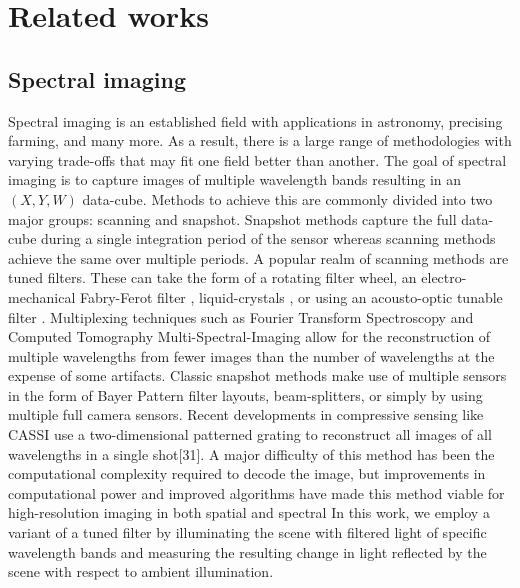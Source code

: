 \section{Related works}
\subsection{Spectral imaging}

Spectral imaging is an established field with applications in astronomy, precising farming, and many more.
As a result, there is a large range of methodologies with varying trade-offs that may fit one field better than another.
The goal of spectral imaging is to capture images of multiple wavelength bands resulting in an $(X,Y,W)$ data-cube.
Methods to achieve this are commonly divided into two major groups: scanning and snapshot.
Snapshot methods capture the full data-cube during a single integration period of the sensor whereas scanning methods achieve the same over multiple periods.
\newline
\newline
A popular realm of scanning methods are tuned filters. These can take the form of a rotating filter wheel, an electro-mechanical Fabry-Ferot filter\cite{MEMSFabryFerot} \cite{Atherton1981}, liquid-crystals \cite{Gupta2008}, or using an acousto-optic tunable filter \cite{poger2001multispectral}.
\newline
Multiplexing techniques such as Fourier Transform Spectroscopy\cite{} and Computed
Tomography Multi-Spectral-Imaging\cite{} allow for the reconstruction of multiple
wavelengths from fewer images than the number of wavelengths at the expense of
some artifacts.
\newline
{}
Classic snapshot methods make use of multiple sensors in the form of Bayer Pattern filter layouts, beam-splitters, or simply by using multiple full camera sensors.
Recent developments in compressive sensing like CASSI use a two-dimensional patterned grating to reconstruct all images of all wavelengths in a single shot[31]. A major difficulty of this method has been the computational complexity required to decode the image, but improvements in computational power and improved algorithms have made this method viable for high-resolution imaging in both spatial and spectral \cite{Gehm2007} \cite{Zhang2011} \cite{Wang17PAMI}
\newline
\newline
In this work, we employ a variant of a tuned filter by illuminating the scene with filtered light of specific wavelength bands and measuring the resulting change in light reflected by the scene with respect to ambient illumination.


